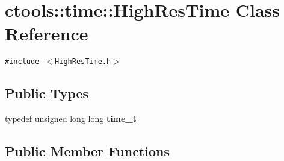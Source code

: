 \section{ctools::time::High\-Res\-Time Class Reference}
\label{classctools_1_1time_1_1HighResTime}
{\tt \#include $<$High\-Res\-Time.h$>$}

\subsection*{Public Types}
\begin{CompactItemize}
\item 
typedef unsigned long long {\bf time\_\-t}
\end{CompactItemize}
\subsection*{Public Member Functions}
